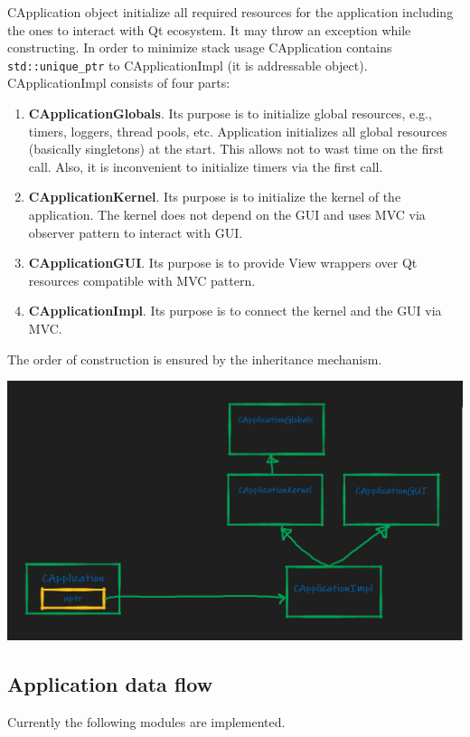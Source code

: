 \documentclass{article}
\begin{document}
CApplication object initialize all required resources for the application including the ones to interact with Qt ecosystem. It may throw an exception while constructing. In order to minimize stack usage CApplication contains \verb"std::unique_ptr" to CApplicationImpl (it is addressable object). CApplicationImpl consists of four parts:
\begin{enumerate}
\item \textbf{CApplicationGlobals}. Its purpose is to initialize global resources, e.g., timers, loggers, thread pools, etc. Application initializes all global resources (basically singletons) at the start. This allows not to wast time on the first call. Also, it is inconvenient to initialize timers via the first call.
\item \textbf{CApplicationKernel}. Its purpose is to initialize the kernel of the application. The kernel does not depend on the GUI and uses MVC via observer pattern to interact with GUI.
\item \textbf{CApplicationGUI}. Its purpose is to provide View wrappers over Qt resources compatible with MVC pattern.
\item \textbf{CApplicationImpl}. Its purpose is to connect the kernel and the GUI via MVC.
\end{enumerate}
The order of construction is ensured by the inheritance mechanism.
\begin{center}
\includegraphics[scale = 0.3]{Figures/CApplicationStructure.png}
\end{center}

\subsection{Application data flow}

Currently the following modules are implemented.
\end{document}

